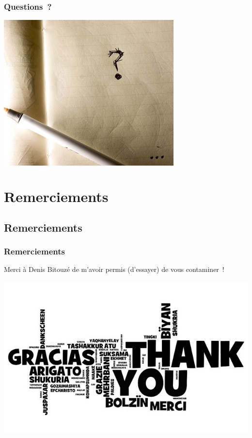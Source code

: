\documentclass[presentation,t,hideothersubsections]{beamer}
\begin{document}
\begin{frame}
\frametitle{Questions ?}
\label{sec-7-1-3}


\includegraphics[width=.8\linewidth]{questions.png}
\end{frame}
\section{Remerciements}
\label{sec-8}
\subsection{Remerciements}
\label{sec-8-1}
\begin{frame}
\frametitle{Remerciements}
\label{sec-8-1-1}


Merci à Denis Bitouzé de m'avoir permis (d'essayer) de vous contaminer !

\includegraphics[width=.8\linewidth]{thank-you-all-languages.png}
\end{frame}
\end{document}
